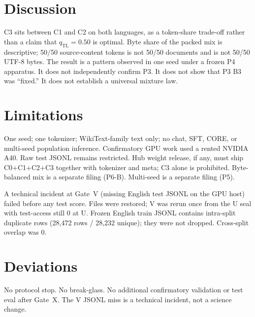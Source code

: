 \documentclass[11pt,a4paper]{article}
\begin{document}
\section{Discussion}
\label{sec:disc}

C3 sits between C1 and C2 on both languages, as a token-share trade-off rather than a claim that $q_{\mathrm{TL}}=0.50$ is optimal. Byte share of the packed mix is descriptive; 50/50 source-content tokens is not 50/50 documents and is not 50/50 UTF-8 bytes. The result is a pattern observed in one seed under a frozen P4 apparatus. It does not independently confirm P3. It does not show that P3 B3 was ``fixed.'' It does not establish a universal mixture law.

\section{Limitations}
\label{sec:limit}

One seed; one tokenizer; WikiText-family text only; no chat, SFT, CORE, or multi-seed population inference. Confirmatory GPU work used a rented NVIDIA A40. Raw test JSONL remains restricted. Hub weight release, if any, must ship C0+C1+C2+C3 together with tokenizer and meta; C3 alone is prohibited. Byte-balanced mix is a separate filing (P6-B). Multi-seed is a separate filing (P5).

A technical incident at Gate~V (missing English test JSONL on the GPU host) failed before any test score. Files were restored; V was rerun once from the U seal with test-access still 0 at U. Frozen English train JSONL contains intra-split duplicate rows (28{,}472 rows / 28{,}232 unique); they were not dropped. Cross-split overlap was 0.

\section{Deviations}
\label{sec:dev}

No protocol stop. No break-glass. No additional confirmatory validation or test eval after Gate~X. The V JSONL miss is a technical incident, not a science change.
\end{document}
